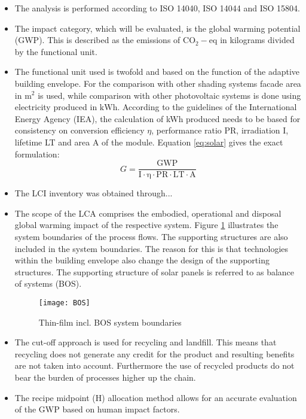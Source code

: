 \begin{itemize}
\item The analysis is performed according to ISO 14040, ISO 14044 and ISO 15804. %
	\item The impact category, which will be evaluated, is the global warming potential (GWP). This is described as the emissions of ${\mathrm{CO_2-eq}}$ in kilograms divided by the functional unit.
	\item The functional unit used is twofold and based on the function of the adaptive building envelope. For the comparison with other shading systems facade area in ${\mathrm{m^2}}$ is used, while comparison with other photovoltaic systems is done using electricity produced in ${\mathrm{kWh}}$. According to the guidelines of the International Energy Agency (IEA), the calculation of kWh produced needs to be based for consistency on conversion efficiency ${\eta}$, performance ratio PR, irradiation I, lifetime LT and area A of the module. Equation \ref{eq:solar} gives the exact formulation:
\begin{equation}
G=\frac{{\mathrm{GWP}}}{{\mathrm{I \cdot \eta  \cdot PR \cdot LT \cdot A}}}
\label{eq:solar}
\end{equation}

	\item The LCI inventory was obtained through...

	\item The scope of the LCA comprises the embodied, operational and disposal global warming impact of the respective system. Figure \ref{fig:BOS} illustrates the system boundaries of the process flows. The supporting structures are also included in the system boundaries. The reason for this is that technologies within the building envelope also change the design of the supporting structures. The supporting structure of solar panels is referred to as balance of systems (BOS).

\begin{figure}[H]
\begin{center}
\texttt{[image: BOS]}
\caption{Thin-film incl. BOS system boundaries}
\label{fig:BOS}
\end{center}
\end{figure}

	\item The cut-off approach is used for recycling and landfill. This means that recycling does not generate any credit for the product and resulting benefits are not taken into account. Furthermore the use of recycled products do not bear the burden of processes higher up the chain.
	\item The recipe midpoint (H) allocation method allows for an accurate evaluation of the GWP based on human impact factors.
\end{itemize}



